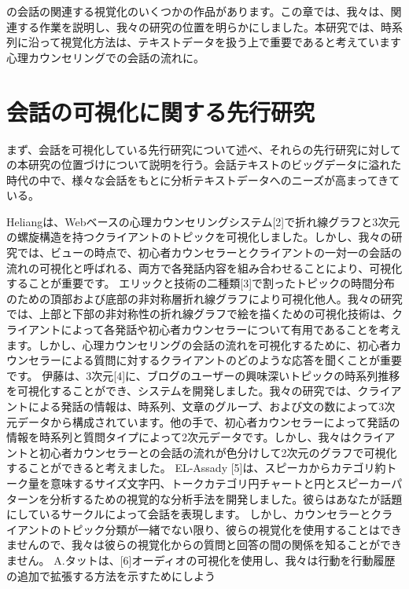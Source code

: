\documentclass[shuuron]{kuee}
\begin{document}



  の会話の関連する視覚化のいくつかの作品があります。この章では、我々は、関連する作業を説明し、我々の研究の位置を明らかにしました。本研究では、時系列に沿って視覚化方法は、テキストデータを扱う上で重要であると考えています 心理カウンセリングでの会話の流れに。


\section{会話の可視化に関する先行研究}

まず、会話を可視化している先行研究について述べ、それらの先行研究に対しての本研究の位置づけについて説明を行う。会話テキストのビッグデータに溢れた時代の中で、様々な会話をもとに分析テキストデータへのニーズが高まってきている。

Heliangは、Webベースの心理カウンセリングシステム[2]で折れ線グラフと3次元の螺旋構造を持つクライアントのトピックを可視化しました。しかし、我々の研究では、ビューの時点で、初心者カウンセラーとクライアントの一対一の会話の流れの可視化と呼ばれる、両方で各発話内容を組み合わせることにより、可視化することが重要です。
  エリックと技術の二種類[3]で割ったトピックの時間分布のための頂部および底部の非対称層折れ線グラフにより可視化他人。我々の研究では、上部と下部の非対称性の折れ線グラフで絵を描くための可視化技術は、クライアントによって各発話や初心者カウンセラーについて有用であることを考えます。しかし、心理カウンセリングの会話の流れを可視化するために、初心者カウンセラーによる質問に対するクライアントのどのような応答を聞くことが重要です。
  伊藤は、3次元[4]に、ブログのユーザーの興味深いトピックの時系列推移を可視化することができ、システムを開発しました。我々の研究では、クライアントによる発話の情報は、時系列、文章のグループ、および文の数によって3次元データから構成されています。他の手で、初心者カウンセラーによって発話の情報を時系列と質問タイプによって2次元データです。しかし、我々はクライアントと初心者カウンセラーとの会話の流れが色分けして2次元のグラフで可視化することができると考えました。
   EL-Assady [5]は、スピーカからカテゴリ約トーク量を意味するサイズ文字円、トークカテゴリ円チャートと円とスピーカーパターンを分析するための視覚的な分析手法を開発しました。彼らはあなたが話題にしているサークルによって会話を表現します。
しかし、カウンセラーとクライアントのトピック分類が一緒でない限り、彼らの視覚化を使用することはできませんので、我々は彼らの視覚化からの質問と回答の間の関係を知ることができません。
  A.タットは、[6]オーディオの可視化を使用し、我々は行動を行動履歴の追加で拡張する方法を示すためにしよう
\end{document}
